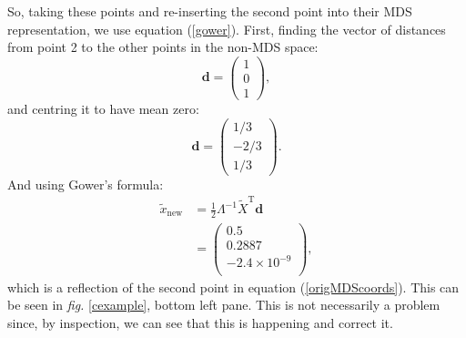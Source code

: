\documentclass[a4paper,10pt]{article}
\newcommand{\fig}[1]{\emph{fig.} \ref{#1}}
\newcommand{\tr}[1]{#1^{\text{T}}}
\newcommand{\cross}{\times}
\begin{document}
So, taking these points and re-inserting the second point into their MDS representation, we use equation (\ref{gower}). First, finding the vector of distances from point 2 to the other points in the non-MDS space:
\begin{equation*}
\mathbf{d}=\begin{pmatrix} 
	1\\
	0\\ 
	1
	\end{pmatrix},
\end{equation*}
and centring it to have mean zero:
\begin{equation*}
\mathbf{d}=\begin{pmatrix} 
	1/3\\
	-2/3\\ 
	1/3
	\end{pmatrix}.
\end{equation*}
And using Gower's formula:
\begin{equation*}
\begin{aligned}
\tilde{x}_{\text{new}} &= \frac{1}{2} \Lambda^{-1} \tr{\tilde{X}} \mathbf{d}\\
&=\begin{pmatrix}
0.5\\
0.2887\\
-2.4 \cross 10^{-9}\\
\end{pmatrix},
\end{aligned}
\end{equation*}
which is a reflection of the second point in equation (\ref{origMDScoords}). This can be seen in \fig{cexample}, bottom left pane. This is not necessarily a problem since, by inspection, we can see that this is happening and correct it.
\end{document}
